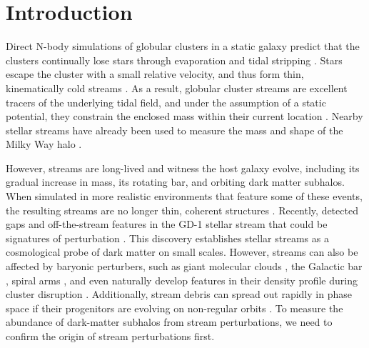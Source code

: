 \documentclass[twocolumn]{aastex62}
\begin{document}

\section{Introduction}
\label{sec:intro}

Direct N-body simulations of globular clusters in a static galaxy predict that the clusters continually lose stars through evaporation and tidal stripping \citep[e.g.,][]{Baumgardt:2003}.
Stars escape the cluster with a small relative velocity, and thus form thin, kinematically cold streams \citep[e.g.,][]{Combes:1999}.
As a result, globular cluster streams are excellent tracers of the underlying tidal field, and under the assumption of a static potential, they constrain the enclosed mass within their current location \citep{Bonaca:2018}.
Nearby stellar streams have already been used to measure the mass and shape of the Milky Way halo \citep[e.g.,][]{Koposov:2010, Kupper:2015, Bovy:2016}.

However, streams are long-lived and witness the host galaxy evolve, including its gradual increase in mass, its rotating bar, and orbiting dark matter subhalos.
When simulated in more realistic environments that feature some of these events, the resulting streams are no longer
thin, coherent structures \citep[e.g.,][]{Bonaca:2014, Ngan:2015, Price-Whelan:2016b}. Recently, \citet{Price-Whelan:2018} detected gaps and off-the-stream features in the GD-1 stellar stream that could be signatures of perturbation \citep{Bonaca:2018b}.
This discovery establishes stellar streams as a cosmological probe of dark matter on small scales.
However, streams can also be affected by baryonic perturbers, such as giant molecular clouds \citep{Amorisco:2016}, the Galactic bar \citep{Pearson:2017}, spiral arms \citep{Banik:2019}, and even naturally develop features in their density profile during cluster disruption \citep[e.g.,][]{Kupper:2008, Just:2009}. Additionally, stream debris can spread out rapidly in phase space if their progenitors are evolving on non-regular orbits \citep[e.g.,][]{Pearson:2015, Fardal:2015, Price-Whelan:2016}.
To measure the abundance of dark-matter subhalos from stream perturbations, we need to confirm the origin of stream perturbations first.
\end{document}
